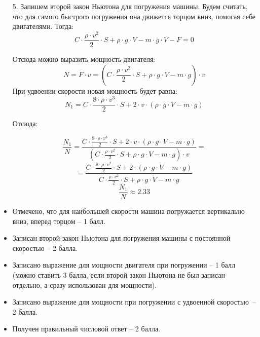 \begin{enumerate}
    \item[5.] Запишем второй закон Ньютона для погружения машины. Будем считать, что для 
    самого быстрого погружения она движется торцом вниз, помогая себе двигателями. Тогда:
    $$C \cdot \frac{\rho \cdot v^2}{2} \cdot S+\rho \cdot g \cdot V-m \cdot g \cdot V-F=0 $$
    
    Отсюда можно выразить мощность двигателя:
    $$N=F \cdot v=\left(C \cdot \frac{\rho \cdot v^2}{2} \cdot S+\rho \cdot g \cdot V-m \cdot g\right) \cdot v$$
    При удвоении скорости новая мощность будет равна:
    $$N_1=C \cdot \frac{8 \cdot \rho \cdot v^3}{2} \cdot S+2 \cdot v \cdot (\rho \cdot g \cdot V-m \cdot g)$$
    
    Отсюда:
    
    $$\frac{N_1}{N}=\frac{C \cdot \frac{8 \cdot \rho \cdot v^3}{2} \cdot S+2 \cdot v \cdot (\rho \cdot g \cdot V-m \cdot g)}{\left(C \cdot \frac{\rho \cdot v^2}{2} \cdot S+\rho \cdot g \cdot V-m \cdot g \right) \cdot v}=$$
    $$=\frac{C \cdot \frac{8 \cdot \rho \cdot v^2}{2} \cdot S+2 \cdot (\rho \cdot g \cdot V-m \cdot g)}{C \cdot \frac{\rho \cdot v^2}{2} \cdot S+\rho \cdot g \cdot V-m \cdot g}$$
    $$\frac{N_1}{N} \approx 2.33$$
\end{enumerate}

\additionalCriteria
    \begin{itemize}
        \item Отмечено, что для наибольшей скорости машина погружается вертикально вниз, вперед торцом – 1 балл.
        \item Записан второй закон Ньютона для погружения машины с постоянной скоростью – 2 балла.
        \item Записано выражение для мощности двигателя при погружении  – 1 балл (можно ставить 3 балла, если второй закон Ньютона не был записан отдельно, а сразу использован для мощности).
        \item Записано выражение для мощности при погружении с удвоенной скоростью~– 2 балла.
        \item Получен правильный числовой ответ – 2 балла.
        
    \end{itemize}